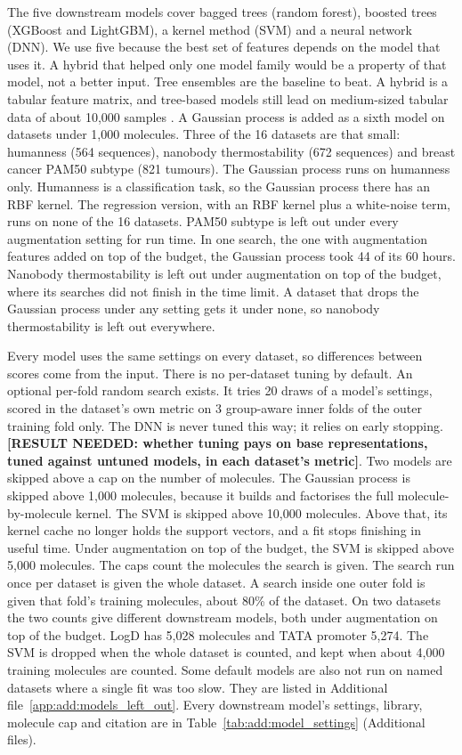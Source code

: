 The five downstream models cover bagged trees (random forest), boosted trees (XGBoost and LightGBM), a kernel method (SVM) and a neural network (DNN). We use five because the best set of features depends on the model that uses it. A hybrid that helped only one model family would be a property of that model, not a better input. Tree ensembles are the baseline to beat. A hybrid is a tabular feature matrix, and tree-based models still lead on medium-sized tabular data of about 10,000 samples \citep{Grinsztajn2022}. A Gaussian process \citep{Rasmussen2006} is added as a sixth model on datasets under 1,000 molecules. Three of the 16 datasets are that small: humanness (564 sequences), nanobody thermostability (672 sequences) and breast cancer PAM50 subtype (821 tumours). The Gaussian process runs on humanness only. Humanness is a classification task, so the Gaussian process there has an RBF kernel. The regression version, with an RBF kernel plus a white-noise term, runs on none of the 16 datasets. PAM50 subtype is left out under every augmentation setting for run time. In one search, the one with augmentation features added on top of the budget, the Gaussian process took 44 of its 60 hours. Nanobody thermostability is left out under augmentation on top of the budget, where its searches did not finish in the time limit. A dataset that drops the Gaussian process under any setting gets it under none, so nanobody thermostability is left out everywhere.

Every model uses the same settings on every dataset, so differences between scores come from the input. There is no per-dataset tuning by default. An optional per-fold random search exists. It tries 20 draws of a model's settings, scored in the dataset's own metric on 3 group-aware inner folds of the outer training fold only. The DNN is never tuned this way; it relies on early stopping. \textbf{[RESULT NEEDED: whether tuning pays on base representations, tuned against untuned models, in each dataset's metric]}. Two models are skipped above a cap on the number of molecules. The Gaussian process is skipped above 1,000 molecules, because it builds and factorises the full molecule-by-molecule kernel. The SVM is skipped above 10,000 molecules. Above that, its kernel cache no longer holds the support vectors, and a fit stops finishing in useful time. Under augmentation on top of the budget, the SVM is skipped above 5,000 molecules. The caps count the molecules the search is given. The search run once per dataset is given the whole dataset. A search inside one outer fold is given that fold's training molecules, about 80\% of the dataset. On two datasets the two counts give different downstream models, both under augmentation on top of the budget. LogD has 5,028 molecules and TATA promoter 5,274. The SVM is dropped when the whole dataset is counted, and kept when about 4,000 training molecules are counted. Some default models are also not run on named datasets where a single fit was too slow. They are listed in Additional file~\ref{app:add:models_left_out}. Every downstream model's settings, library, molecule cap and citation are in Table~\ref{tab:add:model_settings} (Additional files).

